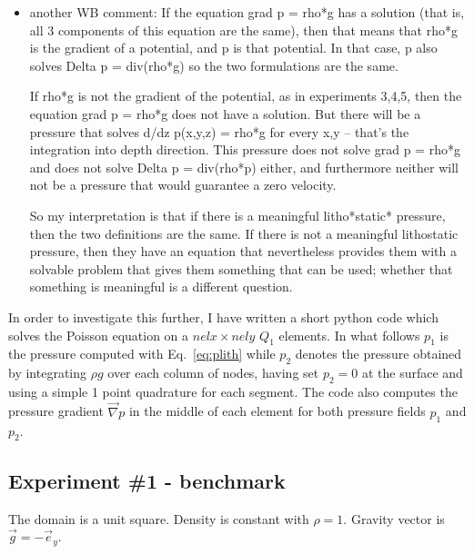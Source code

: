 \begin{itemize}
\item another WB comment: If the equation 
  grad p = rho*g
has a solution (that is, all 3 components of this equation are the same), then that means that rho*g is the gradient of a potential, 
and p is that potential. In that case, p also solves   Delta p = div(rho*g)
so the two formulations are the same.

If rho*g is not the gradient of the potential, as in experiments 3,4,5, then the equation
  grad p = rho*g
does not have a solution. But there will be a pressure that solves
  d/dz p(x,y,z) = rho*g
for every x,y -- that's the integration into depth direction. This pressure does not solve
  grad p = rho*g
and does not solve
  Delta p = div(rho*p)
either, and furthermore neither will not be a pressure that would guarantee a zero velocity.

So my interpretation is that if there is a meaningful litho*static* pressure, then the two definitions are the same. 
If there is not a meaningful lithostatic pressure, then they have an equation that nevertheless provides them with a 
solvable problem that gives them something that can be used; whether that something is meaningful is a different question.

\end{itemize}



\vspace{1cm}

In order to investigate this further, I have written a short python code which solves the Poisson equation 
on a $nelx\times nely$ $Q_1$ elements.
In what follows $p_1$ is the pressure computed with Eq.~\eqref{eq:plith} while $p_2$ denotes the pressure
obtained by integrating $\rho {g}$ over each column of nodes, having set $p_2=0$ at the surface and 
using a simple 1 point quadrature for each segment.
The code also computes the pressure gradient $\vec\nabla p$ in the middle of each element for both 
pressure fields $p_1$ and $p_2$. 

\newpage
\subsection*{Experiment \#1 - benchmark}

The domain is a unit square. Density is constant with $\rho=1$. Gravity vector is $\vec{g}=-\vec{e}_y$.

